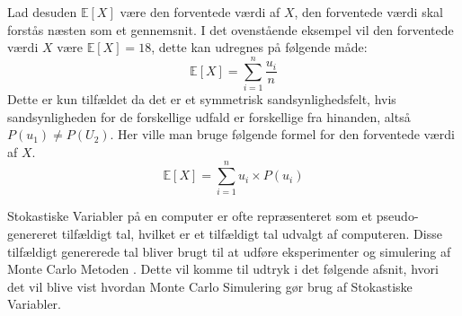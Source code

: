 \documentclass[../../SRP.tex]{subfiles}
\begin{document}
Lad desuden $\mathbb{E}[X]$ være den forventede værdi af $X$, den forventede værdi skal forstås næsten som et gennemsnit. I det ovenstående eksempel vil den forventede værdi $X$ være $\mathbb{E}[X] = 18$, dette kan udregnes på følgende måde:
\begin{equation}
  \mathbb{E}[X] = \sum_{i = 1}^n \frac{u_i}{n}
\end{equation}
Dette er kun tilfældet da det er et symmetrisk sandsynlighedsfelt, hvis sandsynligheden for de forskellige udfald er forskellige fra hinanden, altså  $P(u_1) \neq P(U_2)$. Her ville man bruge følgende formel for den forventede værdi af $X$.
\begin{equation}
  \mathbb{E}[X] = \sum_{i = 1}^n u_i \times P(u_i)
\end{equation}

Stokastiske Variabler på en computer er ofte repræsenteret som et pseudo-genereret tilfældigt tal, hvilket er et tilfældigt tal udvalgt af computeren. Disse tilfældigt genererede tal bliver brugt til at udføre eksperimenter og simulering af Monte Carlo Metoden \cite{SBM}. Dette vil komme til udtryk i det følgende afsnit, hvori det vil blive vist hvordan Monte Carlo Simulering gør brug af Stokastiske Variabler. 
\end{document}
